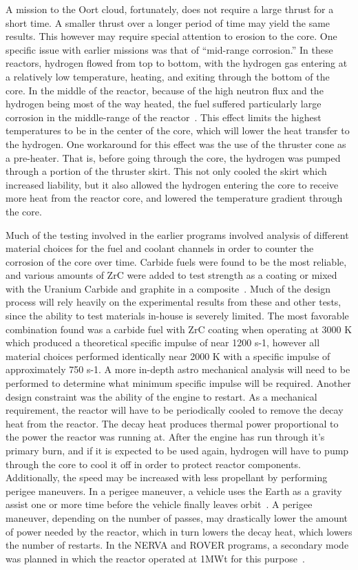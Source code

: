 \documentclass{article}
\begin{document}
A mission to the Oort cloud, fortunately, does not require a large thrust for a short time. A smaller thrust over a longer period of time may yield the same results. This however may require special attention to erosion to the core. One specific issue with earlier missions was that of “mid-range corrosion.” In these reactors, hydrogen flowed from top to bottom, with the hydrogen gas entering at a relatively low temperature, heating, and exiting through the bottom of the core. In the middle of the reactor, because of the high neutron flux and the hydrogen being most of the way heated, the fuel suffered particularly large corrosion in the middle-range of the reactor~\cite{raj2015development}. This effect limits the highest temperatures to be in the center of the core, which will lower the heat transfer to the hydrogen. One workaround for this effect was the use of the thruster cone as a pre-heater. That is, before going through the core, the hydrogen was pumped through a portion of the thruster skirt. This not only cooled the skirt which increased liability, but it also allowed the hydrogen entering the core to receive more heat from the reactor core, and lowered the temperature gradient through the core.


Much of the testing involved in the earlier programs involved analysis of different material choices for the fuel and coolant channels in order to counter the corrosion of the core over time. Carbide fuels were found to be the most reliable, and various amounts of ZrC were added to test strength as a coating or mixed with the Uranium Carbide and graphite in a composite~\cite{lyon1973performance}. Much of the design process will rely heavily on the experimental results from these and other tests, since the ability to test materials in-house is severely limited. The most favorable combination found was a carbide fuel with ZrC coating when operating at 3000 K which produced a theoretical specific impulse of near 1200 s-1, however all material choices performed identically near 2000 K with a specific impulse of approximately 750 s-1. A more in-depth astro mechanical analysis will need to be performed to determine what minimum specific impulse will be required.
Another design constraint was the ability of the engine to restart. As a mechanical requirement, the reactor will have to be periodically cooled to remove the decay heat from the reactor. The decay heat produces thermal power proportional to the power the reactor was running at. After the engine has run through it's primary burn, and if it is expected to be used again, hydrogen will have to pump through the core to cool it off in order to protect reactor components. Additionally, the speed may be increased with less propellant by performing perigee maneuvers. In a perigee maneuver, a vehicle uses the Earth as a gravity assist one or more time before the vehicle finally leaves orbit~\cite{rom1991review}. A perigee maneuver, depending on the number of passes, may drastically lower the amount of power needed by the reactor, which in turn lowers the decay heat, which lowers the number of restarts. In the NERVA and ROVER programs, a secondary mode was planned in which the reactor operated at 1MWt for this purpose~\cite{booth1975}.
\end{document}
